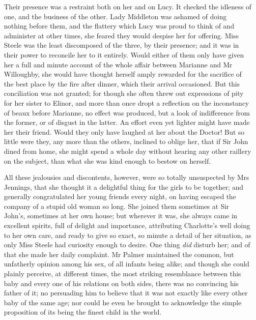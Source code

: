 Their presence was a restraint both on her and on Lucy. It checked the idleness of one, and the business of the other. Lady Middleton was ashamed of doing nothing before them, and the flattery which Lucy was proud to think of and administer at other times, she feared they would despise her for offering. Miss Steele was the least discomposed of the three, by their presence; and it was in their power to reconcile her to it entirely. Would either of them only have given her a full and minute account of the whole affair between Marianne and Mr Willoughby, she would have thought herself amply rewarded for the sacrifice of the best place by the fire after dinner, which their arrival occasioned. But this conciliation was not granted; for though she often threw out expressions of pity for her sister to Elinor, and more than once dropt a reflection on the inconstancy of beaux before Marianne, no effect was produced, but a look of indifference from the former, or of disgust in the latter. An effort even yet lighter might have made her their friend. Would they only have laughed at her about the Doctor! But so little were they, any more than the others, inclined to oblige her, that if Sir John dined from home, she might spend a whole day without hearing any other raillery on the subject, than what she was kind enough to bestow on herself.

All these jealousies and discontents, however, were so totally unsuspected by Mrs Jennings, that she thought it a delightful thing for the girls to be together; and generally congratulated her young friends every night, on having escaped the company of a stupid old woman so long. She joined them sometimes at Sir John's, sometimes at her own house; but wherever it was, she always came in excellent spirits, full of delight and importance, attributing Charlotte's well doing to her own care, and ready to give so exact, so minute a detail of her situation, as only Miss Steele had curiosity enough to desire. One thing \textit{did} disturb her; and of that she made her daily complaint. Mr Palmer maintained the common, but unfatherly opinion among his sex, of all infants being alike; and though she could plainly perceive, at different times, the most striking resemblance between this baby and every one of his relations on both sides, there was no convincing his father of it; no persuading him to believe that it was not exactly like every other baby of the same age; nor could he even be brought to acknowledge the simple proposition of its being the finest child in the world.


